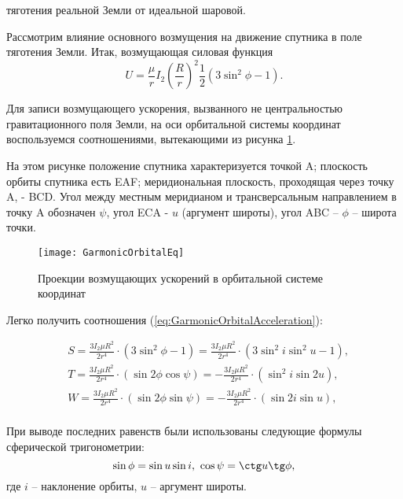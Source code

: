 тяготения реальной Земли от идеальной шаровой.\par
Рассмотрим влияние основного возмущения на движение спутника в поле тяготения Земли.
Итак, возмущающая силовая функция
\begin{equation}
  U = \frac{\mu}{r}I_2\left(\frac{R}{r}\right)^2 \frac{1}{2}(3\sin^2\phi - 1).
\end{equation}\par
  Для записи возмущающего ускорения, вызванного не центральностью гравитационного
поля Земли, на оси орбитальной системы координат воспользуемся соотношениями,
вытекающими из рисунка \ref{fig:GarmonicOrbitalEq}.\par
  На этом рисунке положение спутника характеризуется точкой A; плоскость орбиты
спутника есть EAF; меридиональная плоскость, проходящая через точку A, - BCD.
Угол между местным меридианом и трансверсальным направлением в точку A обозначен
$\psi$, угол ECA - $u$ (аргумент широты), угол ABC -- $\phi$ -- широта точки.
\begin{figure}[h]
  \centering
  \texttt{[image: GarmonicOrbitalEq]}
  \caption{Проекции возмущающих ускорений в орбитальной системе координат}
  \label{fig:GarmonicOrbitalEq}
\end{figure}\par
Легко получить соотношения (\ref{eq:GarmonicOrbitalAcceleration}):\par
\begin{equation} \label{eq:GarmonicOrbitalAcceleration}
  \begin{aligned}
    & S = \frac{3I_2\mu R^2}{2r^4} \cdot (3\sin^2\phi - 1) = \frac{3I_2\mu R^2}{2r^4} \cdot (3\sin^2 i\sin^2 u - 1), \\
    & T = \frac{3I_2\mu R^2}{2r^4} \cdot (\sin2\phi\cos\psi) = - \frac{3I_2\mu R^2}{2r^4} \cdot (\sin^2 i\sin2 u), \\
    & W = \frac{3I_2\mu R^2}{2r^4} \cdot (\sin2\phi\sin\psi) = -\frac{3I_2\mu R^2}{2r^4} \cdot (\sin2 i\sin u), \\
  \end{aligned}
\end{equation}\par
При выводе последних равенств были использованы следующие формулы сферической
тригонометрии:
\begin{equation}
  \sin\phi = \sin u \sin i,\,\, \cos\psi = \ctg u \tg\phi,
\end{equation}
где $i$ -- наклонение орбиты, $u$ -- аргумент широты.
